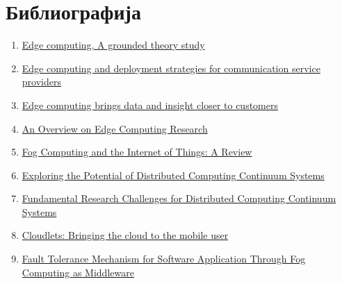 \section{Библиографија}

\begin{enumerate}
    \item \href{https://link.springer.com/article/10.1007/s00607-022-01104-2}{Edge computing, A grounded theory study}
    \item \href{https://www.ericsson.com/en/reports-and-papers/white-papers/edge-computing-and-deployment-strategies-for-communication-service-providers}{Edge computing and deployment strategies for communication service providers}
    \item \href{https://www.redhat.com/en/resources/bring-insight-data-customer-edge-computing-whitepaper}{Edge computing brings data and insight closer to customers}
     \item \href{https://www.researchgate.net/publication/341096184_An_Overview_on_Edge_Computing_Research}{An Overview on Edge Computing Research}
    \item \href{https://www.mdpi.com/2504-2289/2/2/10}{Fog Computing and the Internet of Things: A Review }
    \item \href{https://www.mdpi.com/2073-431X/12/10/198}{Exploring the Potential of Distributed Computing
Continuum Systems}
    \item \href{https://www.mdpi.com/2078-2489/14/3/198}{Fundamental Research Challenges for Distributed Computing
Continuum Systems}
\item \href{https://picture.iczhiku.com/resource/paper/WhIeGHQRAPDTfxCC.pdf}{Cloudlets: Bringing the cloud to the mobile user}
\item \href{https://journal.uob.edu.bh/bitstream/handle/123456789/4584/IJCDS_120105_1570717273.pdf?sequence=3&isAllowed=y}{Fault Tolerance Mechanism for Software Application Through
Fog Computing as Middleware}
\end{enumerate}